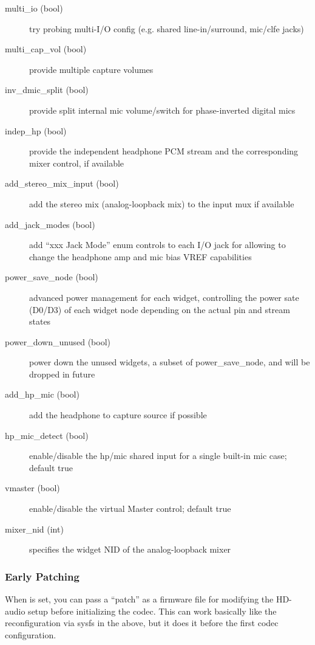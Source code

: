 \documentclass[a4paper,8pt,english]{sphinxmanual}
\begin{document}
\begin{description}
\item[{multi\_io (bool)}] \leavevmode
try probing multi-I/O config (e.g. shared line-in/surround,
mic/clfe jacks)

\item[{multi\_cap\_vol (bool)}] \leavevmode
provide multiple capture volumes

\item[{inv\_dmic\_split (bool)}] \leavevmode
provide split internal mic volume/switch for phase-inverted
digital mics

\item[{indep\_hp (bool)}] \leavevmode
provide the independent headphone PCM stream and the corresponding
mixer control, if available

\item[{add\_stereo\_mix\_input (bool)}] \leavevmode
add the stereo mix (analog-loopback mix) to the input mux if
available

\item[{add\_jack\_modes (bool)}] \leavevmode
add ``xxx Jack Mode'' enum controls to each I/O jack for allowing to
change the headphone amp and mic bias VREF capabilities

\item[{power\_save\_node (bool)}] \leavevmode
advanced power management for each widget, controlling the power
sate (D0/D3) of each widget node depending on the actual pin and
stream states

\item[{power\_down\_unused (bool)}] \leavevmode
power down the unused widgets, a subset of power\_save\_node, and
will be dropped in future

\item[{add\_hp\_mic (bool)}] \leavevmode
add the headphone to capture source if possible

\item[{hp\_mic\_detect (bool)}] \leavevmode
enable/disable the hp/mic shared input for a single built-in mic
case; default true

\item[{vmaster (bool)}] \leavevmode
enable/disable the virtual Master control; default true

\item[{mixer\_nid (int)}] \leavevmode
specifies the widget NID of the analog-loopback mixer

\end{description}


\subsubsection{Early Patching}
\label{sound/hd-audio/notes:early-patching}
When  is set, you can pass a ``patch''
as a firmware file for modifying the HD-audio setup before
initializing the codec.  This can work basically like the
reconfiguration via sysfs in the above, but it does it before the
first codec configuration.
\end{document}
